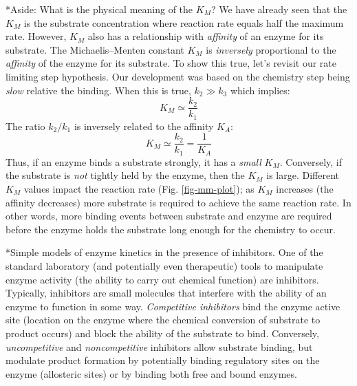 \documentclass[11pt]{article}
\makeatletter
\theoremstyle{definition}
\renewcommand\subsection{\@startsection
	{subsection}{2}{0mm}
	{-0.05in}
	{-0.5\baselineskip}
	{\normalfont\normalsize\bfseries}}
\renewcommand\subsubsection{\@startsection
	{subsubsection}{2}{0mm}
	{-0.05in}
	{-0.5\baselineskip}
	{\normalfont\normalsize\itshape}}
\makeatother
\begin{document}
\subsubsection*{Aside: What is the physical meaning of the $K_{M}$?}
We have already seen that the $K_{M}$ is the substrate concentration where reaction rate equals half the maximum rate.
However, $K_{M}$ also has a relationship with \textit{affinity} of an enzyme for its substrate.
The Michaelis–Menten constant $K_{M}$ is \emph{inversely} proportional to the \emph{affinity} of the enzyme for its substrate. To show this true, let's revisit our rate limiting step hypothesis.
Our development was based on the chemistry step being \emph{slow} relative the binding. When this is true, $k_{2}\gg{k_{3}}$ which implies:
\begin{equation}
	K_{M}\simeq\frac{k_{2}}{k_{1}}
\end{equation}The ratio $k_{2}/k_{1}$ is inversely related to the affinity $K_{A}$:
\begin{equation}
	K_{M}\simeq\frac{k_{2}}{k_{1}} = \frac{1}{K_{A}}
\end{equation}Thus, if an enzyme binds a substrate strongly, it has a \emph{small} $K_{M}$. Conversely, if the substrate is \emph{not} tightly held by the enzyme, then the $K_{M}$ is large.
Different $K_{M}$ values impact the reaction rate (Fig. \ref{fig-mm-plot}); as $K_{M}$ increases (the affinity decreases) more substrate is required to achieve the same reaction rate. In other words, more binding events between substrate and enzyme are required before the enzyme holds the substrate long enough for the chemistry to occur.

\subsection*{Simple models of enzyme kinetics in the presence of inhibitors.}
One of the standard laboratory (and potentially even therapeutic) tools to manipulate enzyme activity (the ability to carry out chemical function) are inhibitors.
Typically, inhibitors are small molecules that interfere with the ability of an enzyme to function in some way.
\emph{Competitive inhibitors} bind the enzyme active site (location on the enzyme where the chemical conversion of substrate to product occurs) and block the ability of the substrate to bind.
Conversely, \textit{uncompetitive} and \textit{noncompetitive} inhibitors
allow substrate binding, but modulate product formation by potentially binding regulatory sites on the enzyme (allosteric sites)
or by binding both free and bound enzymes.
\end{document}
